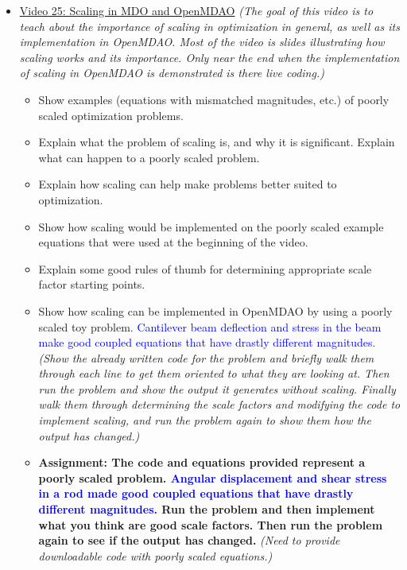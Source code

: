 \documentclass[12pt, letterpaper]{article}
\begin{document}
\begin{itemize}
	\item \underline{Video 25: Scaling in MDO and OpenMDAO} \textit{(The goal of this video is to teach about the importance of scaling in optimization in general, as well as its implementation in OpenMDAO. Most of the video is slides illustrating how scaling works and its importance. Only near the end when the implementation of scaling in OpenMDAO is demonstrated is there live coding.)}
		\begin{itemize}
			\item Show examples (equations with mismatched magnitudes, etc.) of poorly scaled optimization problems.
			\item Explain what the problem of scaling is, and why it is significant. Explain what can happen to a poorly scaled problem.
			\item Explain how scaling can help make problems better suited to optimization.
			\item Show how scaling would be implemented on the poorly scaled example equations that were used at the beginning of the video.
			\item Explain some good rules of thumb for determining appropriate scale factor starting points.
			\item Show how scaling can be implemented in OpenMDAO by using a poorly scaled toy problem. \textcolor{blue}{Cantilever beam deflection and stress in the beam make good coupled equations that have drastly different magnitudes.} \textit{(Show the already written code for the problem and briefly walk them through each line to get them oriented to what they are looking at. Then run the problem and show the output it generates without scaling. Finally walk them through determining the scale factors and modifying the code to implement scaling, and run the problem again to show them how the output has changed.)}
			\item \textbf{Assignment: The code and equations provided represent a poorly scaled problem. \textcolor{blue}{Angular displacement and shear stress in a rod made good coupled equations that have drastly different magnitudes.} Run the problem and then implement what you think are good scale factors. Then run the problem again to see if the output has changed.} \textit{(Need to provide downloadable code with poorly scaled equations.)}
		\end{itemize}
		

\end{itemize}
\end{document}
